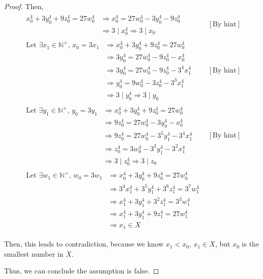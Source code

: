 \documentclass[12pt]{article}
\begin{document}
\begin{itemize}
\begin{proof}
    Then,
    \setcounter{equation}{0}
    \begin{align}
        \begin{split}
        x_0^4 + 3y_0^4 + 9z_0^4 = 27w_0^4 &\Rightarrow x_0^4 = 27w_0^4 - 3y_0^4 - 9z_0^4\\
        & \Rightarrow 3 \mid x_0^4 \Rightarrow 3 \mid x_0
        \end{split} & [\text{By hint}]\\[1em]
        \begin{split}
        \text{Let $\exists x_1 \in \mathbb{N}^+$, $x_0 = 3x_1$} &\Rightarrow x_0^4 + 3y_0^4 + 9z_0^4 = 27w_0^4\\
        &\Rightarrow 3y_0^4 = 27w_0^4 - 9z_0^4 - x_0^4\\
        &\Rightarrow 3y_0^4 = 27w_0^4 - 9z_0^4 - 3^4x_1^4\\
        &\Rightarrow y_0^4 = 9w_0^4 - 3z_0^4 - 3^3x_1^4\\
        &\Rightarrow 3 \mid y_0^4 \Rightarrow 3 \mid y_0
        \end{split} & [\text{By hint}]\\[1em]
        \begin{split}
        \text{Let $\exists y_1 \in \mathbb{N}^+$, $y_0 = 3y_1$} &\Rightarrow x_0^4 + 3y_0^4 + 9z_0^4 = 27w_0^4\\
        &\Rightarrow 9z_0^4 = 27w_0^4 - 3y_0^4 - x_0^4\\
        &\Rightarrow 9z_0^4 = 27w_0^4 - 3^5y_1^4 - 3^4x_1^4\\
        &\Rightarrow z_0^4 = 3w_0^4 - 3^3y_1^4 - 3^2x_1^4\\
        &\Rightarrow 3 \mid z_0^4 \Rightarrow 3 \mid z_0
        \end{split} & [\text{By hint}]\\[1em]
        \begin{split}
        \text{Let $\exists w_1 \in \mathbb{N}^+$, $w_0 = 3w_1$} &\Rightarrow x_0^4 + 3y_0^4 + 9z_0^4 = 27w_0^4\\
        &\Rightarrow 3^4x_1^4 + 3^5y_1^4 + 3^6z_1^4 = 3^7w_1^4\\
        &\Rightarrow x_1^4 + 3y_1^4 + 3^2z_1^4 = 3^3w_1^4\\
        &\Rightarrow x_1^4 + 3y_1^4 + 9z_1^4 = 27w_1^4\\
        &\Rightarrow x_1 \in X
        \end{split}
    \end{align}

    \bigskip

    Then, this leads to contradiction, because we know $x_1 < x_0$, $x_1 \in X$,
    but $x_0$ is the smallest number in $X$.

    \bigskip

    Thus, we can conclude the assumption is false.

    \end{proof}
\end{itemize}
\end{document}
